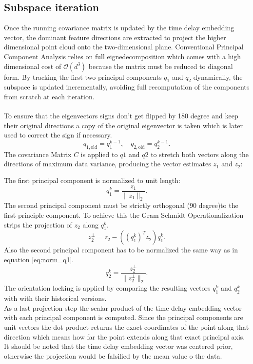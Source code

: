 \subsection{Subspace iteration}
Once the running covariance matrix is updated by the time delay embedding vector, the dominant feature directions are extracted to project the higher dimensional point cloud onto the two-dimensional plane. Conventional Principal Component Analysis relies on full eignedecomposition which comes with a high dimensional cost of $\mathcal{O}(d^3)$ because the matrix must be reduced to diagonal form. By tracking the first two principal components $q_1$ and $q_2$ dynamically, the subspace is updated incrementally, avoiding full recomputation of the components from scratch at each iteration.
\\ \\
To ensure that the eigenvectors signs don't get flipped by 180 degree and keep their original directions a copy of the original eigenvector is taken which is later used to correct the sign if necessary. 
\begin{equation}
    q_{1,\text{old}} = q_1^{k-1}, \quad q_{2,\text{old}} = q_2^{k-1}.
    \label{eq:old_eigenvectors}
\end{equation}
The covariance Matrix $C$ is applied to $q1$ and $q2$ to stretch both vectors along the directions of maximum data variance, producing the vector estimates $z_1$ and $z_2$:

The first principal component is normalized to unit length:
\begin{equation}
    q_1^k = \frac{z_1}{\|z_1\|_2}.
    \label{eq:norm_q1}
\end{equation}
The second principal component must be strictly orthogonal (90 degree)to the first principle component. To achieve this the Gram-Schmidt Operationalization strips the projection of $z_2$ along $q_1^k$.
\begin{equation}
    z_2^{\perp} = z_2 - \left( (q_1^k)^T z_2 \right) q_1^k.
    \label{eq:gram_schmidt}
\end{equation}
Also the second principal component has to be normalized the same way as in equation \ref{eq:norm_q1}.
\begin{equation}
    q_2^k = \frac{z_2^{\perp}}{\|z_2^{\perp}\|_2}.
    \label{eq:norm_q2}
\end{equation}
The orientation locking is applied by comparing the resulting vectors $q_1^k$ and $q_2^k$ with with their historical versions.\\
As a last projection step the scalar product of the time delay embedding vector with each principal component is computed. Since the principal components are unit vectors the dot product returns the exact coordinates of the point along that direction which means how far the point extends along that exact principal axis. It should be noted that the time delay embedding vector was centered prior, otherwise the projection would be falsified by the mean value o the data.
